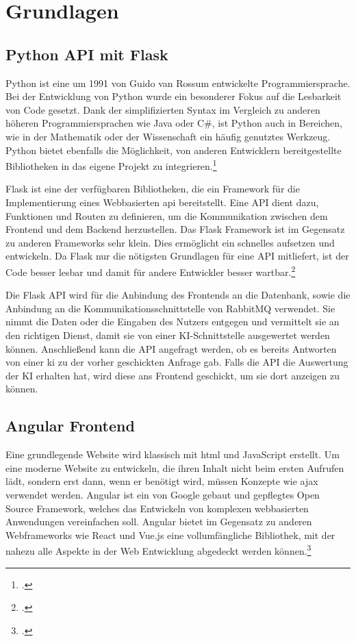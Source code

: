 \section{Grundlagen}

\subsection{Python API mit Flask}
Python ist eine um 1991 von Guido van Rossum entwickelte Programmiersprache. Bei der Entwicklung von Python wurde ein besonderer Fokus auf die Lesbarkeit von Code gesetzt. Dank der simplifizierten Syntax im Vergleich zu anderen höheren Programmiersprachen wie Java oder C\#, ist Python auch in Bereichen, wie in der Mathematik oder der Wissenschaft ein häufig genutztes Werkzeug. Python bietet ebenfalls die Möglichkeit, von anderen Entwicklern bereitgestellte Bibliotheken in das eigene Projekt zu integrieren.\footcite{python2021python} 

Flask ist eine der verfügbaren Bibliotheken, die ein Framework für die Implementierung eines Webbasierten \ac{api} bereitstellt. Eine API dient dazu, Funktionen und Routen zu definieren, um die Kommunikation zwischen dem Frontend und dem Backend herzustellen. Das Flask Framework ist im Gegensatz zu anderen Frameworks sehr klein. Dies ermöglicht ein schnelles aufsetzen und entwickeln. Da Flask nur die nötigsten Grundlagen für eine API mitliefert, ist der Code besser lesbar und damit für andere Entwickler besser wartbar.\footcite{grinberg2018flask} 

Die Flask API wird für die Anbindung des Frontends an die Datenbank, sowie die Anbindung an die Kommunikationsschnittstelle von RabbitMQ verwendet. Sie nimmt die Daten oder die Eingaben des Nutzers entgegen und vermittelt sie an den richtigen Dienst, damit sie von einer KI-Schnittstelle ausgewertet werden können. Anschließend kann die API angefragt werden, ob es bereits Antworten von einer \ac{ki} zu der vorher geschickten Anfrage gab. Falls die API die Auswertung der KI erhalten hat, wird diese ans Frontend geschickt, um sie dort anzeigen zu können.  

\subsection{Angular Frontend}
Eine grundlegende Website wird klassisch mit \ac{html} und JavaScript erstellt. Um eine moderne Website zu entwickeln, die ihren Inhalt nicht beim ersten Aufrufen lädt, sondern erst dann, wenn er benötigt wird, müssen Konzepte wie \ac{ajax} verwendet werden. Angular ist ein von Google gebaut und gepflegtes Open Source Framework, welches das Entwickeln von komplexen webbasierten Anwendungen vereinfachen soll. Angular bietet im Gegensatz zu anderen Webframeworks wie React und Vue.js eine vollumfängliche Bibliothek, mit der nahezu alle Aspekte in der Web Entwicklung abgedeckt werden können.\footcite{moiseev2018angular}

